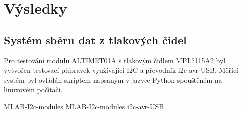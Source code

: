 \documentclass[12pt,a4paper,oneside]{article}
\begin{document}
\section{Výsledky}

\subsection{Systém sběru dat z tlakových čidel}

Pro testování modulu ALTIMET01A s tlakovým čidlem MPL3115A2 byl vytvořen testovací přípravek využívající I2C a převodník i2c-avr-USB. Měřící systém byl ovládán skriptem napsaným v jazyce Python spouštěném na linuxovém počítači.  

\begin{thebibliography}{99}
\href{https://github.com/MLAB-project/MLAB-I2c-modules}{MLAB-I2c-modules}
\href{svn://svn.mlab.cz/mlab/Modules/Sensors/ALTIMET01A/SW/Python}{MLAB-I2c-modules}
\href{http://wiki.mlab.cz/doku.php?id=cs:i2c_avr_usb}{i2c-avr-USB}
\end{thebibliography}
\end{document}
